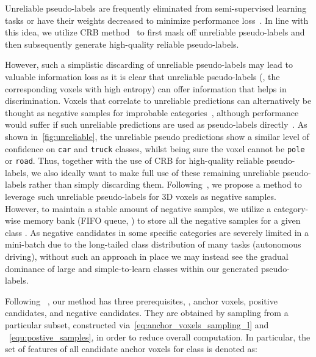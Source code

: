 \documentclass[10pt,twocolumn,letterpaper]{article}
\begin{document}
\noindent
Unreliable pseudo-labels are frequently eliminated from semi-supervised learning tasks or have their weights decreased to minimize performance loss~\cite{sajjadi2016regularization,xie2020selftraining,zou2021pseudoseg,jiang2021guided,yang2022stb,Unal_2022_CVPR}. In line with this idea, we utilize CRB method~\cite{Unal_2022_CVPR} to first mask off unreliable pseudo-labels and then subsequently generate high-quality reliable pseudo-labels. 

However, such a simplistic discarding of unreliable pseudo-labels may lead to valuable information loss as it is clear that unreliable pseudo-labels (\ie, the corresponding voxels with high entropy) can offer information that helps in discrimination. Voxels that correlate to unreliable predictions can alternatively be thought as negative samples for improbable categories~\cite{wang2022semisupervised}, although performance would suffer if such unreliable predictions are used as pseudo-labels directly~\cite{arazo2020pseudolabeling}. 
As shown in~\cref{fig:unreliable}, the unreliable pseudo predictions show a similar level of confidence on \texttt{car} and \texttt{truck} classes, whilst being sure the voxel cannot be \texttt{pole} or \texttt{road}. 
Thus, together with the use of CRB for high-quality reliable pseudo-labels, we also ideally want to make full use of these remaining unreliable pseudo-labels rather than simply discarding them. Following~\cite{wang2022semisupervised}, we propose a method to leverage such unreliable pseudo-labels for 3D voxels as negative samples. However, to maintain a stable amount of negative samples, we utilize a category-wise memory bank  (FIFO queue, \cite{wu2018unsupervised}) to store all the negative samples for a given class . As negative candidates in some specific categories are severely limited in a mini-batch due to the long-tailed class distribution of many tasks (\eg autonomous driving), without such an approach in place we may instead see the gradual dominance of large and simple-to-learn classes within our generated pseudo-labels. 


Following ~\cite{oord2019representation,he2020momentum}, our method has three prerequisites, \ie, anchor voxels, positive candidates, and negative candidates. They are obtained by sampling from a particular subset, constructed via~\cref{eq:anchor_voxels_sampling_l} and ~\cref{equ:postive_samples}, in order to reduce overall computation. In particular, the set of features of all candidate anchor voxels for class  is denoted as:
\end{document}
